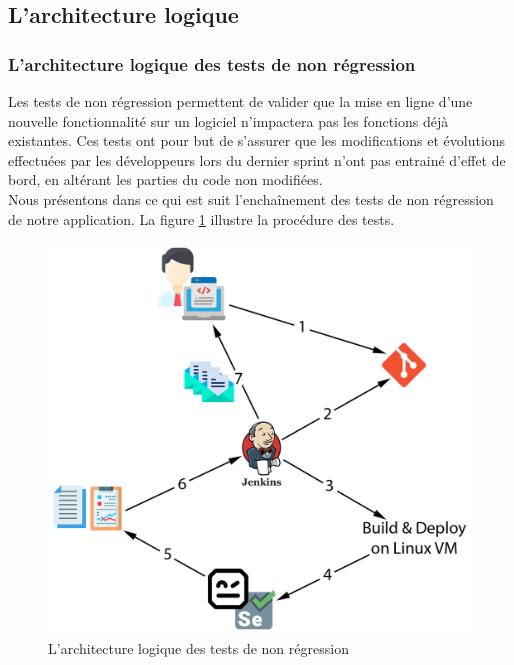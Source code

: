 \subsection[L'architecture logique]{L'architecture logique}
\subsubsection{L'architecture logique des tests de non régression}
Les tests de non régression permettent de valider que la mise en ligne d’une nouvelle fonctionnalité sur un logiciel n’impactera pas les fonctions déjà existantes. Ces tests ont pour but de s’assurer que les modifications et évolutions effectuées par les développeurs lors du dernier sprint n’ont pas entrainé d’effet de bord, en altérant les parties du code non modifiées.\\
Nous présentons dans ce qui est suit l'enchaînement des tests de non régression de notre application. La figure \ref{fig:jenkins-schema} illustre la procédure des tests.
\begin{figure}[H]
	\centering
	\includegraphics[width=0.5\linewidth]{img/jenkins}
	\caption[L'architecture logique des tests de non régression]{L'architecture logique des tests de non régression}
	\label{fig:jenkins-schema}
\end{figure}
